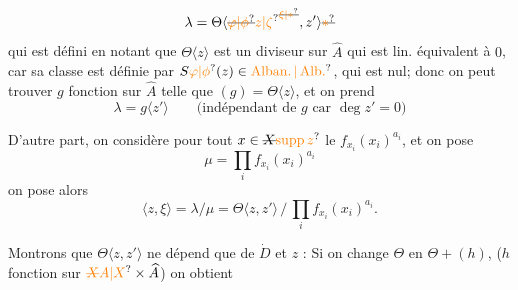 \[
\lambda=\Theta\langle\deleted{\unsure{\varphi|\phi}}{\unsure{z|\zeta}}^{\deleted{\unsure{\xi|*}}},z'\rangle\deleted{\unsure{*}}
\]
qui est défini en notant que $\Theta\langle z\rangle$ est un  diviseur sur $\widehat A$ qui est lin. équivalent à $0$, car sa classe est définie par $S\unsure{\varphi|\phi}(z)\in\unsure{\operatorname{Alban.}|\operatorname{Alb.}}$, qui est nul; donc on peut  trouver $g$ fonction sur $\widehat A$ telle que $(g)=\Theta\langle z\rangle$, et on prend
\[
\lambda=g\langle z'\rangle\qquad\text{(indépendant de }g\text{ car }\deg z'=0\text{)}
\]

D'autre part, on considère pour tout $x\in\deleted{X}\unsure{\operatorname{supp}z}$ le  $f_{x_i}(x_i)^{a_i}$, et on pose
\[
\mu=\prod_i f_{x_i}(x_i)^{a_i}
\]
on pose alors
\[
\langle z,\xi\rangle=\lambda/\mu=\Theta\langle z,z'\rangle\,/\,\prod_i f_{x_i}(x_i)^{a_i}.
\]

Montrons que $\Theta\langle z,z'\rangle$ ne dépend que de $\dot D$ et $z$ : Si on change $\Theta$ en $\Theta+(h)$, ($h$ fonction sur $\unsure{\deleted{X}A|X}\times\widehat A$)  on obtient
